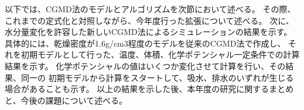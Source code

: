 以下では、CGMD法のモデルとアルゴリズムを次節において述べる。
その際、これまでの定式化と対照しながら、今年度行った拡張について述べる。
次に、水分量変化を許容した新しいCGMD法によるシミュレーションの結果を示す。
具体的には、乾燥密度が1.6g/cm3程度のモデルを従来のCGMD法で作成し、
それを初期モデルとして行った、温度、体積、化学ポテンシャル一定条件での計算結果を示す。
化学ポテンシャルの値はいくつか変化させて計算を行い、その結果、同一の
初期モデルから計算をスタートして、吸水、排水のいずれが生じる場合があることも示す。
以上の結果を示した後、本年度の研究に関するまとめと、今後の課題について述べる。

%
